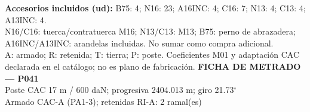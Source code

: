 \begingroup\scriptsize
\textbf{Accesorios incluidos (ud):} B75: 4; N16: 23; A16INC: 4; C16: 7; N13: 4; C13: 4; A13INC: 4.\\
N16/C16: tuerca/contratuerca M16; N13/C13: M13; B75: perno de abrazadera; A16INC/A13INC: arandelas incluidas. No sumar como compra adicional.\\
A: armado; R: retenida; T: tierra; P: poste. Coeficientes M01 y adaptación CAC declarada en el catálogo; no es plano de fabricación.
\endgroup\endgroup
\clearpage{}
\begingroup\small\setlength{\parskip}{3pt}\renewcommand{\arraystretch}{1.05}
\textbf{\large FICHA DE METRADO — P041}\\[4pt]
Poste CAC 17 m / 600 daN; progresiva 2404.013 m; giro 21.73\ensuremath{^\circ}\\
Armado CAC-A (PA1-3); retenidas RI-A: 2 ramal(es)\\
\begingroup\scriptsize
